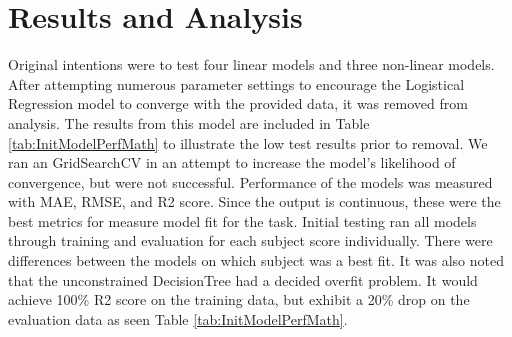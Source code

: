 \documentclass[man,floatsintext]{apa6} %
\begin{document}
\section{Results and Analysis}
Original intentions were to test four linear models and three non-linear models. After attempting numerous parameter settings to encourage the Logistical Regression model to converge with the provided data, it was removed from analysis. The results from this model are included in Table \ref{tab:InitModelPerfMath} to illustrate the low test results prior to removal. We ran an GridSearchCV in an attempt to increase the model's likelihood of convergence, but were not successful.
Performance of the models was measured with MAE, RMSE, and R2 score. Since the output is continuous, these were the best metrics for measure model fit for the task.
Initial testing ran all models through training and evaluation for each subject score individually. There were differences between the models on which subject was a best fit.  It was also noted that the unconstrained DecisionTree had a decided overfit problem. It would achieve 100\% R2 score on the training data, but exhibit a 20\% drop on the evaluation data as seen Table \ref{tab:InitModelPerfMath}.
\end{document}
